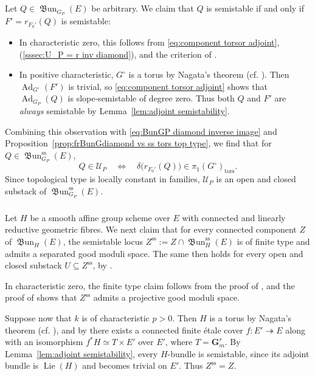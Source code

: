 \documentclass[12pt, oneside]{amsart}
\numberwithin{equation}{section}
\theoremstyle{remark}
\theoremstyle{plain}
\newcommand{\GGm}{\mathbf{G}_{m}}
\newcommand{\UU}{\mathcal{U}}
\renewcommand{\ss}{\mathrm{ss}}
\newcommand{\frBun}{\operatorname{\mathfrak{B}un}}
\begin{document}
Let $Q \in \frBun_{G_P}(E)$ be arbitrary.
We claim that $Q$ is semistable if and only if $F'=r_{F_0'}(Q)$ is semistable:
\begin{itemize}
	\item
  In characteristic zero, this follows from \eqref{eq:component torsor adjoint}, (\ref{sssec:U_P = r inv diamond}), and the criterion of \cite[Lem.~3.8]{ORT}.

  \item
  In positive characteristic, $G^\circ$ is a torus by Nagata's theorem (cf. \cite[Thm.~1.2]{HallRydh}).
  Then $\operatorname{Ad}_{G^\circ}(F')$ is trivial, so \eqref{eq:component torsor adjoint} shows that $\operatorname{Ad}_{G_P}(Q)$ is slope-semistable of degree zero.
  Thus both $Q$ and $F'$ are \emph{always} semistable by Lemma~\ref{lem:adjoint semistability}.
\end{itemize}

Combining this observation with \eqref{eq:BunGP diamond inverse image} and Proposition~\ref{prop:frBunGdiamond vs ss tors top type}, we find that for $Q\in\frBun_{G_P}^{\ss}(E)$,
\[
  Q\in\UU_P
  \quad\Longleftrightarrow\quad
  \delta\bigl(r_{F_0'}(Q)\bigr)\in\pi_1(G^\circ)_{\mathrm{tors}}.
\]
Since topological type is locally constant in families, $\UU_P$ is an open and closed substack of $\frBun_{G_P}^{\ss}(E)$.

\subsubsection{}\label{sssec:Z^ss gms char 0}

Let $H$ be a smooth affine group scheme over $E$ with connected and linearly reductive geometric fibres.
We next claim that for every connected component $Z$ of $\frBun_H(E)$, the semistable locus $Z^{\ss} := Z \cap \frBun_H^{\ss}(E)$ is of finite type and admits a separated good moduli space.
The same then holds for every open and closed substack $U \subseteq Z^{\ss}$, by \cite[Lem.~4.14]{Alper}.

In characteristic zero, the finite type claim follows from the proof of \cite[Lem.~8.2]{AHLH}, and the proof of \cite[Lem.~3.14]{ORT} shows that $Z^{\ss}$ admits a projective good moduli space.

Suppose now that $k$ is of characteristic $p>0$.
Then $H$ is a torus by Nagata's theorem (cf. \cite[Thm.~1.2]{HallRydh}), and by \cite[Exp.~X, Thm.~5.16]{SGA3} there exists a connected finite \'etale cover $f: E' \twoheadrightarrow E$ along with an isomorphism $f^*H\simeq T\times E'$ over $E'$, where $T = \GGm^r$.
By Lemma~\ref{lem:adjoint semistability}, every $H$-bundle is semistable, since its adjoint bundle is $\operatorname{Lie}(H)$ and becomes trivial on $E'$.
Thus $Z^{\ss}=Z$.
\end{document}
